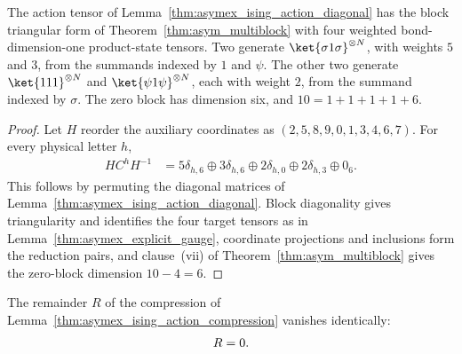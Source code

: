 \begin{lemma}%
    \label{thm:asymex_ising_action_compression}
    \leanok
    The action tensor of Lemma~\ref{thm:asymex_ising_action_diagonal}
    has the block triangular form of Theorem~\ref{thm:asym_multiblock}
    with four weighted bond-dimension-one product-state tensors.
    Two generate $\ket{\sigma1\sigma}^{\otimes N}$, with weights
    $5$ and $3$, from the summands indexed by $1$ and $\psi$.
    The other two generate $\ket{111}^{\otimes N}$ and
    $\ket{\psi1\psi}^{\otimes N}$, each with weight $2$, from the
    summand indexed by $\sigma$.
    The zero block has dimension six, and $10=1+1+1+1+6$.
\end{lemma}

\begin{proof}
    \leanok
    Let $H$ reorder the auxiliary coordinates as
    $(2,5,8,9,0,1,3,4,6,7)$. For every physical letter $h$,
    \begin{align}
        HC^hH^{-1}
         & =5\delta_{h,6}\oplus3\delta_{h,6}
        \oplus2\delta_{h,0}\oplus2\delta_{h,3}\oplus0_6.
        \label{eq:asymex_ising_action_blocks}
    \end{align}
    This follows by permuting the diagonal matrices of
    Lemma~\ref{thm:asymex_ising_action_diagonal}.
    Block diagonality gives triangularity and identifies the four
    target tensors as in Lemma~\ref{thm:asymex_explicit_gauge},
    coordinate projections and inclusions form the reduction pairs, and
    clause~(vii) of Theorem~\ref{thm:asym_multiblock} gives the
    zero-block dimension $10-4=6$.
\end{proof}

\begin{lemma}%
    \label{thm:asymex_ising_action_split}
    \leanok
    The remainder $R$ of the compression of
    Lemma~\ref{thm:asymex_ising_action_compression} vanishes identically:
    \begin{align}
        R = 0.
        \notag
    \end{align}
\end{lemma}


